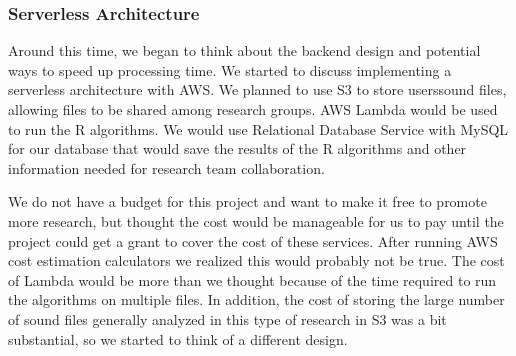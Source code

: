 \subsubsection{Serverless Architecture}
Around this time, we began to think about the backend design and potential ways to speed up processing time. We started to discuss implementing a serverless architecture with AWS. We planned to use S3 to store users\textquotesingle sound files, allowing files to be shared among research groups. AWS Lambda would be used to run the R algorithms. We would use Relational Database Service with MySQL for our database that would save the results of the R algorithms and other information needed for research team collaboration.\par
We do not have a budget for this project and want to make it free to promote more research, but thought the cost would be manageable for us to pay until the project could get a grant to cover the cost of these services. After running AWS cost estimation calculators we realized this would probably not be true. The cost of Lambda would be more than we thought because of the time required to run the algorithms on multiple files. In addition, the cost of storing the large number of sound files generally analyzed in this type of research in S3 was a bit substantial, so we started to think of a different design.\par

